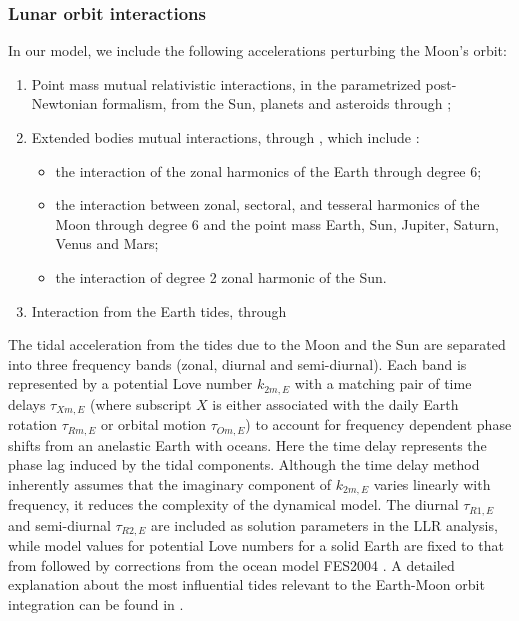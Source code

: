 \documentclass[fleqn,usenatbib,referee]{mnras}
\begin{document}
      \subsubsection{Lunar orbit interactions}
    \label{lunorbit}
    In our model, we include the following accelerations perturbing the Moon's orbit:
      \begin{enumerate}
      \item Point mass mutual relativistic interactions, in the parametrized post-Newtonian formalism, from the Sun, planets and asteroids through \citet[Eqn. 27]{Folkner2014};
      \item Extended bodies mutual interactions, through \citet[Eqn. 28]{Folkner2014}, which include :
      \begin{itemize}
        \item the interaction of the zonal harmonics of the Earth through degree 6;
        \item the interaction between zonal, sectoral, and tesseral harmonics of the Moon through degree 6 and the point mass Earth, Sun, Jupiter, Saturn, Venus and Mars;
        \item the interaction of degree 2 zonal harmonic of the Sun.
      \end{itemize}
      \item Interaction from the Earth tides, through \citet[Eqn. 32]{Folkner2014}
      \end{enumerate}
      The tidal acceleration from the tides due to the Moon and the Sun are separated into three frequency bands (zonal, diurnal and semi-diurnal). Each band is represented by a potential Love number $k_{2m,E}$ with a matching pair of time delays $\tau_{Xm,E}$ (where subscript $X$ is either associated with the daily Earth rotation $\tau_{Rm,E}$ or orbital motion $\tau_{Om,E}$) to account for frequency dependent phase shifts from an anelastic Earth with oceans. Here the time delay represents the phase lag induced by the tidal components. Although the time delay method inherently assumes that the imaginary component of $k_{2m,E}$ varies linearly with frequency, it reduces the complexity of the dynamical model. The diurnal $\tau_{R1,E}$ and semi-diurnal $\tau_{R2,E}$ are included as solution parameters in the LLR analysis, while model values for potential Love numbers for a solid Earth are fixed to that from \citet[Table 6.3]{IERS2010} followed by corrections from the ocean model FES2004 \cite[]{Lyard2006}. A detailed explanation about the most influential tides relevant to the Earth-Moon orbit integration can be found in \citet[Table 6]{Williams2016Secular}.
\end{document}
